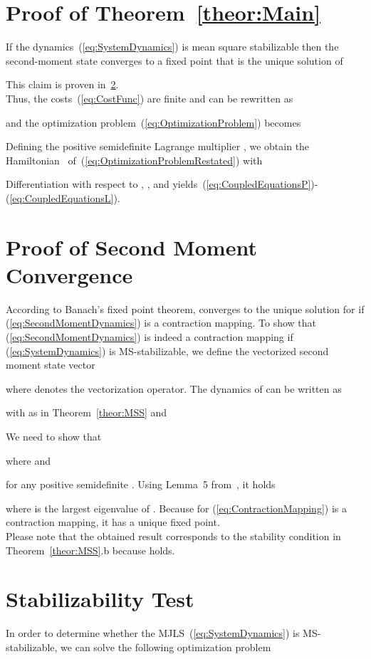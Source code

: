 \documentclass[preprint,1p,11pt]{IR-Template/ISAS_IR}
\begin{document}
   \appendix
   \section{Proof of Theorem~\ref{theor:Main}}
   	\label{app:ProofMainTheorem}
   	If the dynamics~(\ref{eq:SystemDynamics}) is mean square stabilizable then the second-moment state converges to a fixed point  that is the unique solution of

This claim is proven in~\ref{app:ProofConvergence}.\\

Thus, the costs~(\ref{eq:CostFunc}) are finite and can be rewritten as~

and the optimization problem~(\ref{eq:OptimizationProblem}) becomes

Defining the positive semidefinite Lagrange multiplier , we obtain the Hamiltonian~ of~(\ref{eq:OptimizationProblemRestated}) with

Differentiation with respect to , , and  yields~(\ref{eq:CoupledEquationsP})-(\ref{eq:CoupledEquationsL}).


    	
   \section{Proof of Second Moment Convergence}
   	\label{app:ProofConvergence}
   	According to Banach's fixed point theorem,  converges to the unique solution  for  if (\ref{eq:SecondMomentDynamics}) is a contraction mapping. To show that (\ref{eq:SecondMomentDynamics}) is indeed a contraction mapping if (\ref{eq:SystemDynamics}) is MS-stabilizable, we define the vectorized second moment state vector

where  denotes the vectorization operator. The dynamics of  can be written as

with  as in Theorem~\ref{theor:MSS} and

We need to show that

where  and

for any positive semidefinite . Using Lemma~5 from~\cite{Wang_86}, it holds

where  is the largest eigenvalue of . Because for  (\ref{eq:ContractionMapping}) is a contraction mapping, it has a unique fixed point.\\

Please note that the obtained result corresponds to the stability condition in Theorem~\ref{theor:MSS}.b because  holds.    	
   \section{Stabilizability Test}
   	\label{app:StabilizabilityTest}
   	In order to determine whether the MJLS~(\ref{eq:SystemDynamics}) is MS-stabilizable, we can solve the following optimization problem
\end{document}
